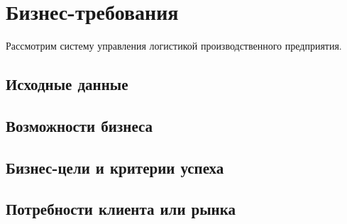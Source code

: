 \chapter{Бизнес-требования}
\label{ch:chap1}

Рассмотрим систему управления логистикой производственного предприятия.


\section{Исходные данные}
\label{sec:asis}


\section{Возможности бизнеса}
\label{sec:possibilities}


\section{Бизнес-цели и критерии успеха}
\label{sec:goals}


\section{Потребности клиента или рынка}
\label{sec:reqirements}

\endinput
